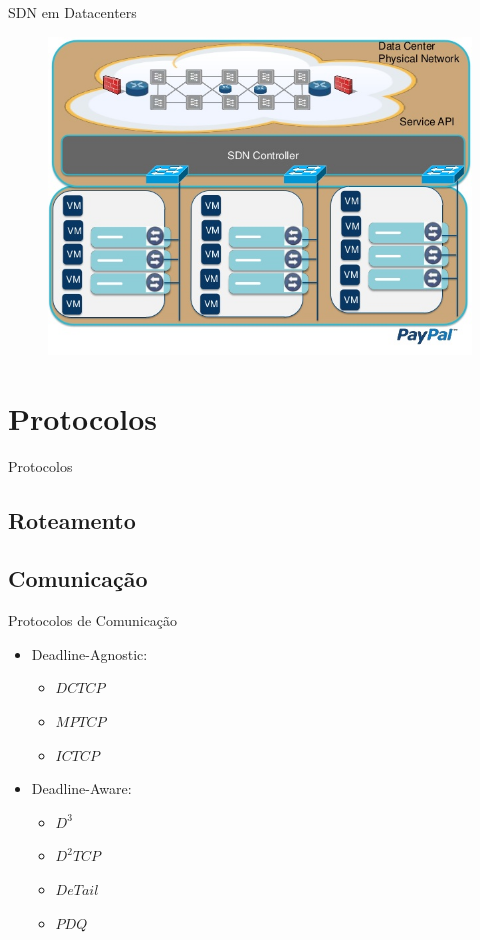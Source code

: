 \documentclass[aspectratio=169]{beamer}
\begin{document}
	\begin{frame} {SDN em Datacenters}
		\begin{figure}[ht]   
			\includegraphics[scale=0.4]{imagens/sdn-3.jpg}
			\label{fig:sample_figure}
		\end{figure}
	\end{frame}

\section{Protocolos}{Protocolos}
	\subsection{Roteamento}
	\subsection{Comunicação}

	\begin{frame} {Protocolos de Comunicação}
	\begin{itemize}
	 	\item
	 		Deadline-Agnostic:
			\begin{itemize}
			 	\item
			 		$DCTCP$
			 	\item
					$MPTCP$
			 	\item
					$ICTCP$
			 \end{itemize}
	 	\item
	 		Deadline-Aware:
			\begin{itemize}
			 	\item
			 		$D^3$
			 	\item
					$D^2TCP$
			 	\item
					$DeTail$
			 	\item
					$PDQ$
			 \end{itemize}
	 \end{itemize}
	\end{frame}
\end{document}
